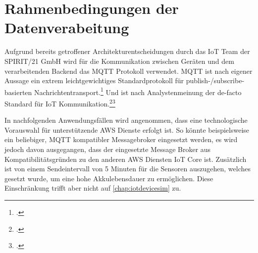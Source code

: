 \section{Rahmenbedingungen der Datenverabeitung}\label{chap:rahmendatenverarbeitung}
Aufgrund bereits getroffener Architekturentscheidungen durch das \ac{IoT} Team der SPIRIT/21 GmbH wird für die Kommunikation zwischen Geräten und dem verarbeitenden Backend das \ac{MQTT} Protokoll verwendet. \ac{MQTT} ist nach eigener Aussage ein extrem leichtgewichtiges Standardprotokoll für publish-/subscribe-basierten Nachrichtentransport.\footcite[Vgl.][]{o.V..2020} Und ist nach Analystenmeinung der de-facto Standard für \ac{IoT} Kommunikation.\footcite[Vgl.][]{Skerrett.25.10.2019}\nzitat \footcite[Vgl.][]{Cabe.17.04.2018} 

In nachfolgenden Anwendungsfällen wird angenommen, dass eine technologische Vorauswahl für unterstützende \ac{AWS} Dienste erfolgt ist.
So könnte beispielsweise ein beliebiger, \ac{MQTT} kompatibler Messagebroker eingesetzt werden, es wird jedoch davon ausgegangen, dass der eingesetzte Message Broker aus Kompatibilitätsgründen zu den anderen \ac{AWS} Diensten \ac{IoT} Core ist. Zusätzlich ist von einem Sendeintervall von 5 Minuten für die Sensoren auszugehen, welches gesetzt wurde, um eine hohe Akkulebensdauer zu ermöglichen. Diese Einschränkung trifft aber nicht auf \autoref{chap:iotdevicesim} zu.

